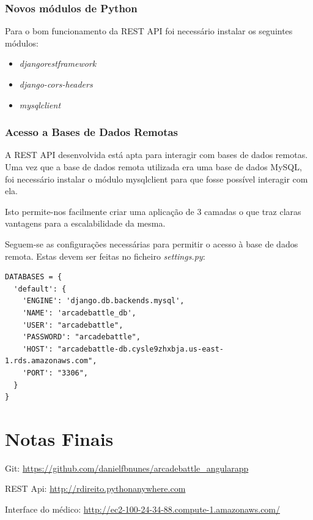 \documentclass[12pt]{article}
\begin{document}
\subsubsection{Novos módulos de Python}
Para o bom funcionamento da REST API foi necessário instalar os seguintes módulos:
\begin{itemize}
    \item \textit{djangorestframework}
    \item \textit{django-cors-headers}
    \item \textit{mysqlclient}
\end{itemize}

\subsubsection{Acesso a Bases de Dados Remotas}
A REST API desenvolvida está apta para interagir com bases de dados remotas.
Uma vez que a base de dados remota utilizada era uma base de dados MySQL, foi necessário instalar o módulo mysqlclient para que fosse possível interagir com ela.
\par Isto permite-nos facilmente criar uma aplicação de 3 camadas o que traz claras vantagens para a escalabilidade da mesma.
\par Seguem-se as configurações necessárias para permitir o acesso à base de dados remota. Estas devem ser feitas no ficheiro \textit{settings.py}:

\vspace{8mm}

\begin{lstlisting}[caption={Configurações para acesso à base de dados remota},captionpos=b]
DATABASES = {
  'default': {
    'ENGINE': 'django.db.backends.mysql',
    'NAME': 'arcadebattle_db',
    'USER': "arcadebattle",
    'PASSWORD': "arcadebattle",
    'HOST': "arcadebattle-db.cysle9zhxbja.us-east-1.rds.amazonaws.com",
    'PORT': "3306",
  }
}
\end{lstlisting}
\clearpage

\section{Notas Finais}

Git: \url{https://github.com/danielfbnunes/arcadebattle_angularapp} \\
\par REST Api: \url{http://rdireito.pythonanywhere.com} \\
\par Interface do médico: \url{http://ec2-100-24-34-88.compute-1.amazonaws.com/}
\end{document}
